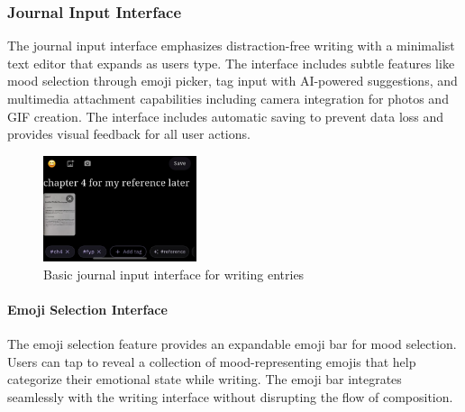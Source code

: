 \subsubsection{Journal Input Interface}

The journal input interface emphasizes distraction-free writing with a minimalist text editor that expands as users type. The interface includes subtle features like mood selection through emoji picker, tag input with AI-powered suggestions, and multimedia attachment capabilities including camera integration for photos and GIF creation. The interface includes automatic saving to prevent data loss and provides visual feedback for all user actions.

\begin{figure}[H]
\centering
\includegraphics[width=0.4\textwidth]{files/imgs/prototype/journal_input_basic.jpeg}
\caption{Basic journal input interface for writing entries}
\label{fig:journal-input-basic}
\end{figure}

\paragraph{Emoji Selection Interface}

The emoji selection feature provides an expandable emoji bar for mood selection. Users can tap to reveal a collection of mood-representing emojis that help categorize their emotional state while writing. The emoji bar integrates seamlessly with the writing interface without disrupting the flow of composition.

